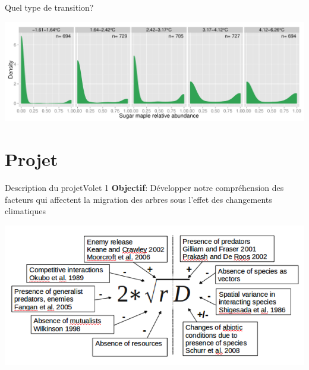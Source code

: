 \documentclass{eecslides}
\begin{document}
	\begin{frame}{Quel type de transition?}
		\begin{center}
		\includegraphics[height=0.4\textheight]{ass_ers}\\
		\end{center}
	\end{frame}

%

	\section{Projet}
%	
	\begin{frame}{Description du projet}{Volet 1}
		\textbf{Objectif}: Développer notre compréhension des facteurs qui affectent la migration des arbres sous l'effet des changements climatiques

		\begin{center}
			\includegraphics[height=0.5\textheight]{svenning.png}
		\end{center}

	\end{frame}
%
	
\end{document}
